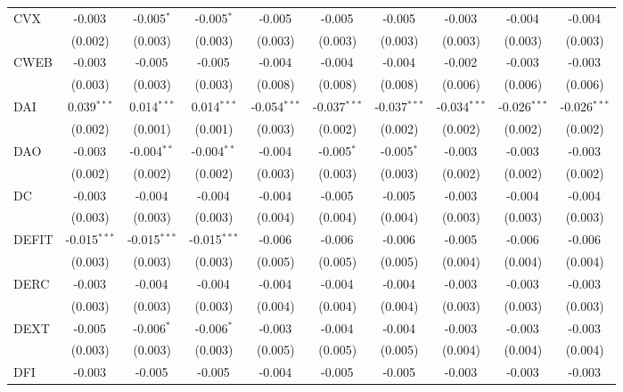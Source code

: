 \begin{table}[!htbp]
\begin{tabular}{@{\extracolsep{5pt}}lccccccccc}
 CVX & -0.003$^{}$ & -0.005$^{*}$ & -0.005$^{*}$ & -0.005$^{}$ & -0.005$^{}$ & -0.005$^{}$ & -0.003$^{}$ & -0.004$^{}$ & -0.004$^{}$ \\
  & (0.002) & (0.003) & (0.003) & (0.003) & (0.003) & (0.003) & (0.003) & (0.003) & (0.003) \\
 CWEB & -0.003$^{}$ & -0.005$^{}$ & -0.005$^{}$ & -0.004$^{}$ & -0.004$^{}$ & -0.004$^{}$ & -0.002$^{}$ & -0.003$^{}$ & -0.003$^{}$ \\
  & (0.003) & (0.003) & (0.003) & (0.008) & (0.008) & (0.008) & (0.006) & (0.006) & (0.006) \\
 DAI & 0.039$^{***}$ & 0.014$^{***}$ & 0.014$^{***}$ & -0.054$^{***}$ & -0.037$^{***}$ & -0.037$^{***}$ & -0.034$^{***}$ & -0.026$^{***}$ & -0.026$^{***}$ \\
  & (0.002) & (0.001) & (0.001) & (0.003) & (0.002) & (0.002) & (0.002) & (0.002) & (0.002) \\
 DAO & -0.003$^{}$ & -0.004$^{**}$ & -0.004$^{**}$ & -0.004$^{}$ & -0.005$^{*}$ & -0.005$^{*}$ & -0.003$^{}$ & -0.003$^{}$ & -0.003$^{}$ \\
  & (0.002) & (0.002) & (0.002) & (0.003) & (0.003) & (0.003) & (0.002) & (0.002) & (0.002) \\
 DC & -0.003$^{}$ & -0.004$^{}$ & -0.004$^{}$ & -0.004$^{}$ & -0.005$^{}$ & -0.005$^{}$ & -0.003$^{}$ & -0.004$^{}$ & -0.004$^{}$ \\
  & (0.003) & (0.003) & (0.003) & (0.004) & (0.004) & (0.004) & (0.003) & (0.003) & (0.003) \\
 DEFIT & -0.015$^{***}$ & -0.015$^{***}$ & -0.015$^{***}$ & -0.006$^{}$ & -0.006$^{}$ & -0.006$^{}$ & -0.005$^{}$ & -0.006$^{}$ & -0.006$^{}$ \\
  & (0.003) & (0.003) & (0.003) & (0.005) & (0.005) & (0.005) & (0.004) & (0.004) & (0.004) \\
 DERC & -0.003$^{}$ & -0.004$^{}$ & -0.004$^{}$ & -0.004$^{}$ & -0.004$^{}$ & -0.004$^{}$ & -0.003$^{}$ & -0.003$^{}$ & -0.003$^{}$ \\
  & (0.003) & (0.003) & (0.003) & (0.004) & (0.004) & (0.004) & (0.003) & (0.003) & (0.003) \\
 DEXT & -0.005$^{}$ & -0.006$^{*}$ & -0.006$^{*}$ & -0.003$^{}$ & -0.004$^{}$ & -0.004$^{}$ & -0.003$^{}$ & -0.003$^{}$ & -0.003$^{}$ \\
  & (0.003) & (0.003) & (0.003) & (0.005) & (0.005) & (0.005) & (0.004) & (0.004) & (0.004) \\
 DFI & -0.003$^{}$ & -0.005$^{}$ & -0.005$^{}$ & -0.004$^{}$ & -0.005$^{}$ & -0.005$^{}$ & -0.003$^{}$ & -0.003$^{}$ & -0.003$^{}$ \\

\end{tabular}
\end{table}
